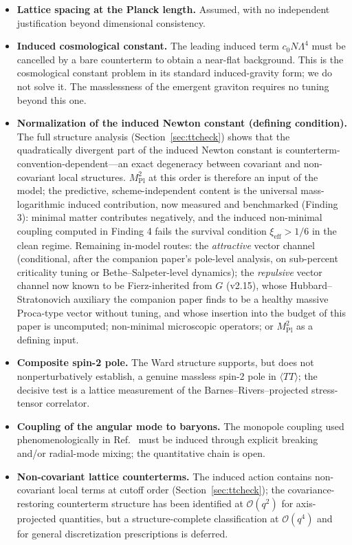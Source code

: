 \documentclass[11pt,a4paper]{article}
\begin{document}
\begin{itemize}
\item \textbf{Lattice spacing at the Planck length.}
  Assumed, with no independent justification beyond dimensional
  consistency.
\item \textbf{Induced cosmological constant.}
  The leading induced term $c_0 N \Lambda^4$ must be cancelled by a
  bare counterterm to obtain a near-flat background.
  This is the cosmological constant problem in its standard
  induced-gravity form; we do not solve it.
  The masslessness of the emergent graviton requires no tuning
  beyond this one.
\item \textbf{Normalization of the induced Newton constant
  (defining condition).}
  The full structure analysis (Section~\ref{sec:ttcheck}) shows
  that the quadratically divergent part of the induced Newton
  constant is counterterm-convention-dependent---an exact
  degeneracy between covariant and non-covariant local structures.
  $M_{\mathrm{Pl}}^2$ at this order is therefore an input of the
  model; the predictive, scheme-independent content is the
  universal mass-logarithmic induced contribution, now measured and
  benchmarked (Finding 3): minimal matter contributes negatively,
  and the induced non-minimal coupling computed in Finding 4 fails
  the survival condition $\xi_{\mathrm{eff}} > 1/6$ in the clean
  regime.
  Remaining in-model routes: the \emph{attractive} vector channel
  (conditional, after the companion paper's pole-level analysis, on
  sub-percent criticality tuning or Bethe--Salpeter-level
  dynamics); the \emph{repulsive} vector channel now known to be
  Fierz-inherited from $G$ (v2.15), whose Hubbard--Stratonovich
  auxiliary the companion paper finds to be a healthy massive
  Proca-type vector without tuning, and whose insertion into the
  budget of this paper is uncomputed; non-minimal microscopic
  operators; or $M_{\mathrm{Pl}}^2$ as a defining input.
\item \textbf{Composite spin-2 pole.}
  The Ward structure supports, but does not nonperturbatively
  establish, a genuine massless spin-2 pole in
  $\langle TT\rangle$; the decisive test is a lattice measurement
  of the Barnes--Rivers--projected stress-tensor correlator.
\item \textbf{Coupling of the angular mode to baryons.}
  The monopole coupling used phenomenologically in
  Ref.~\cite{Cheng:2025sparc} must be induced through explicit
  breaking and/or radial-mode mixing; the quantitative chain is
  open.
\item \textbf{Non-covariant lattice counterterms.}
  The induced action contains non-covariant local terms at cutoff
  order (Section~\ref{sec:ttcheck}); the covariance-restoring
  counterterm structure has been identified at $\mathcal{O}(q^2)$
  for axis-projected quantities, but a structure-complete
  classification at $\mathcal{O}(q^4)$ and for general
  discretization prescriptions is deferred.
\end{itemize}
\end{document}
